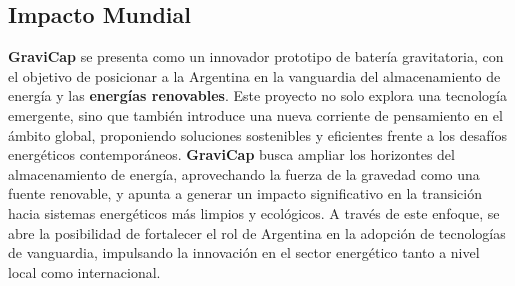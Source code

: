            \subsection{Impacto Mundial}
                \textcolor{dark_violet}{\textbf{GraviCap}} se presenta como un innovador prototipo de batería gravitatoria, con el objetivo de posicionar a la Argentina en la vanguardia del almacenamiento de energía y las \textbf{energías renovables}. Este proyecto no solo explora una tecnología emergente, sino que también introduce una nueva corriente de pensamiento en el ámbito global, proponiendo soluciones sostenibles y eficientes frente a los desafíos energéticos contemporáneos. \textcolor{dark_violet}{\textbf{GraviCap}} busca ampliar los horizontes del almacenamiento de energía, aprovechando la fuerza de la gravedad como una fuente renovable, y apunta a generar un impacto significativo en la transición hacia sistemas energéticos más limpios y ecológicos. A través de este enfoque, se abre la posibilidad de fortalecer el rol de Argentina en la adopción de tecnologías de vanguardia, impulsando la innovación en el sector energético tanto a nivel local como internacional.\par
